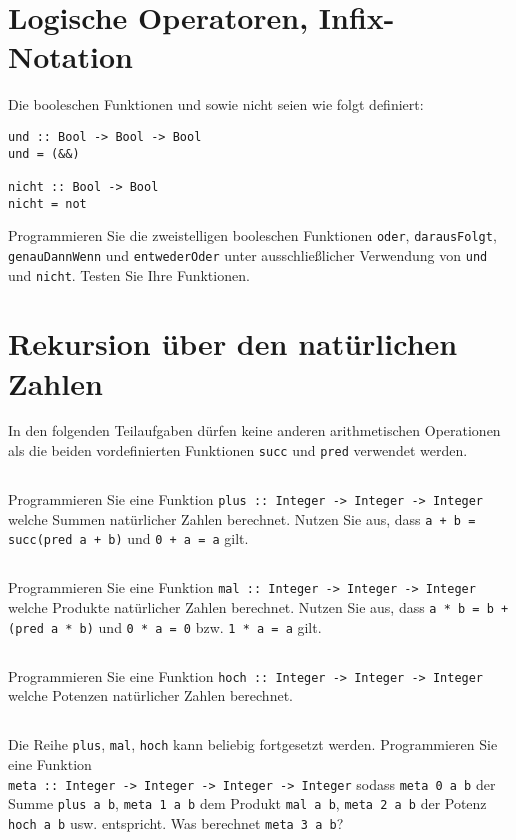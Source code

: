 \documentclass[
  10pt,                   %
  DIV12,
  german,                 %
  oneside,                %
  parskip=half,           %
  headings=normal,        %
  captions=tableheading,  %
]{scrartcl}
\begin{document}
\section{Logische Operatoren, Infix-Notation}
Die booleschen Funktionen und sowie nicht seien wie folgt definiert:

\begin{lstlisting}
und :: Bool -> Bool -> Bool
und = (&&)

nicht :: Bool -> Bool
nicht = not
\end{lstlisting}

Programmieren Sie die zweistelligen booleschen Funktionen \lstinline|oder|, \lstinline|darausFolgt|, \lstinline|genauDannWenn| und \lstinline|entwederOder| unter ausschließlicher Verwendung von \lstinline|und|
und \lstinline|nicht|. Testen Sie Ihre Funktionen.

\section{Rekursion über den natürlichen Zahlen}
In den folgenden Teilaufgaben dürfen keine anderen arithmetischen Operationen als die beiden vordefinierten Funktionen \lstinline|succ| und \lstinline|pred| verwendet werden.
\subsection{}
Programmieren Sie eine Funktion \lstinline|plus :: Integer -> Integer -> Integer| welche Summen natürlicher Zahlen berechnet. Nutzen Sie aus, dass \lstinline|a + b = succ(pred a + b)| und \lstinline|0 + a = a| gilt.
\subsection{}
Programmieren Sie eine Funktion \lstinline|mal :: Integer -> Integer -> Integer| welche Produkte natürlicher Zahlen berechnet. Nutzen Sie aus, dass \lstinline|a * b = b + (pred a * b)| und \lstinline|0 * a = 0| bzw. \lstinline|1 * a = a| gilt.
\subsection{}
Programmieren Sie eine Funktion \lstinline|hoch :: Integer -> Integer -> Integer| welche Potenzen natürlicher Zahlen berechnet. 
\subsection{}
Die Reihe \lstinline|plus|, \lstinline|mal|, \lstinline|hoch| kann beliebig fortgesetzt werden. Programmieren Sie eine Funktion \\\lstinline|meta :: Integer -> Integer -> Integer -> Integer| sodass \lstinline|meta 0 a b| der Summe \lstinline|plus a b|, \lstinline|meta 1 a b| dem Produkt \lstinline|mal a b|, \lstinline|meta 2 a b| der Potenz \lstinline|hoch a b| usw. entspricht. Was berechnet \lstinline|meta 3 a b|?
\newpage
\end{document}

